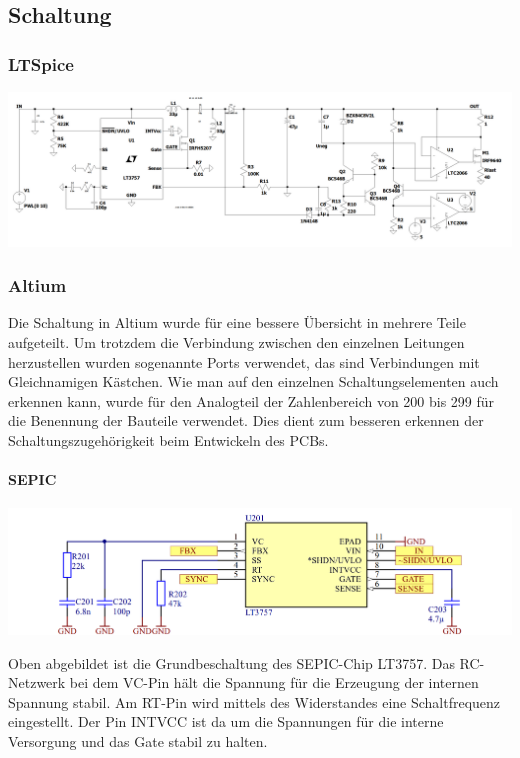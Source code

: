 \documentclass[paper=a4, 12pt]{scrreprt}
\begin{document}
		\subsection{Schaltung}\hfill \break
			\subsubsection{LTSpice}\hfill \break
			\begin{adjustbox}{angle=90, center,caption={Simulationsschaltung des Analogteils in LTSpice},label={fig:LTSpice-Schaltung-Analogteil},nofloat=figure,vspace=\bigskipamount}
				\includegraphics[width=20cm]{img/LTSpice_Schaltung_Analogteil.PNG}
			\end{adjustbox}
			\pagebreak
			\subsubsection{Altium}\hfill \break
			Die Schaltung in Altium wurde für eine bessere Übersicht in mehrere Teile aufgeteilt. Um trotzdem die Verbindung zwischen den einzelnen Leitungen herzustellen wurden sogenannte Ports verwendet, das sind Verbindungen mit Gleichnamigen Kästchen. Wie man auf den einzelnen Schaltungselementen auch erkennen kann, wurde für den Analogteil der Zahlenbereich von 200 bis 299 für die Benennung der Bauteile verwendet. Dies dient zum besseren erkennen der Schaltungszugehörigkeit beim Entwickeln des PCBs.
			\paragraph{SEPIC}\hfill \break
			\begin{adjustbox}{center,caption={Grundbeschaltung des LT3757},label={fig:LT3757-Grundbeschaltung},nofloat=figure,vspace=\bigskipamount}
				\includegraphics[width=\textwidth]{img/SEPIC_Altium.PNG}
			\end{adjustbox}
			Oben abgebildet ist die Grundbeschaltung des SEPIC-Chip LT3757. Das RC-Netzwerk bei dem VC-Pin hält die Spannung für die Erzeugung der internen Spannung stabil. Am RT-Pin wird mittels des Widerstandes eine Schaltfrequenz eingestellt. Der Pin INTVCC ist da um die Spannungen für die interne Versorgung und das Gate stabil zu halten.
\end{document}
